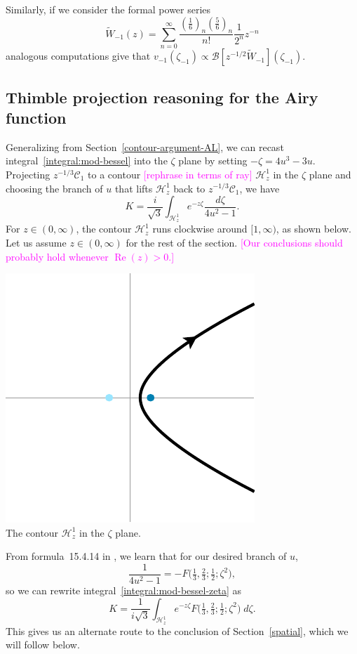 \documentclass{article}
\newcommand{\borel}{\mathcal{B}}
\theoremstyle{definition}
\theoremstyle{plain}
\begin{document}
Similarly, if we consider the formal power series
\begin{equation}
\tilde{W}_{-1}(z)=\sum_{n=0}^{\infty}\frac{\left(\frac{1}{6}\right)_n\left(\frac{5}{6}\right)_n}{n!}\frac{1}{2^n}z^{-n}
\end{equation}
analogous computations give that $v_{-1}(\zeta_{-1})\propto\borel\left[z^{-1/2}\tilde{W}_{-1}\right](\zeta_{-1})$.
\subsection{Thimble projection reasoning for the Airy function}\label{contour-argument}
Generalizing from Section~\ref{contour-argument-AL}, we can recast integral~\eqref{integral:mod-bessel} into the $\zeta$ plane by setting $-\zeta = 4u^3 - 3u$. Projecting $z^{-1/3} \mathcal{C}_1$ to a contour \textcolor{magenta}{[rephrase in terms of ray]} $\mathcal{H}^1_z$ in the $\zeta$ plane and choosing the branch of $u$ that lifts $\mathcal{H}^1_z$ back to $z^{-1/3} \mathcal{C}_1$, we have
\begin{equation}\label{integral:mod-bessel-zeta}
K = \frac{i}{\sqrt{3}} \int_{\mathcal{H}^1_z} e^{-z\zeta}\frac{d\zeta}{4u^2 - 1}.
\end{equation}
For $z \in (0, \infty)$, the contour $\mathcal{H}^1_z$ runs clockwise around $[1, \infty)$, as shown below. Let us assume $z \in (0, \infty)$ for the rest of the section. \textcolor{magenta}{[Our conclusions should probably hold whenever $\operatorname{Re}(z) > 0$.]}
\begin{center}
\includegraphics{figures/zeta_contour_3.pdf} \\[1em]
{\small The contour $\mathcal{H}^1_z$ in the $\zeta$ plane.}
\end{center}
From formula~15.4.14 in \cite{dlmf}, we learn that for our desired branch of $u$,
\[ \frac{1}{4u^2 - 1} = -F\big(\tfrac{1}{3}, \tfrac{2}{3}; \tfrac{1}{2}; \zeta^2\big), \]
so we can rewrite integral~\eqref{integral:mod-bessel-zeta} as
\[ K = \frac{1}{i\sqrt{3}} \int_{\mathcal{H}^1_z} e^{-z\zeta} F\big(\tfrac{1}{3}, \tfrac{2}{3}; \tfrac{1}{2}; \zeta^2\big)\;d\zeta. \]
This gives us an alternate route to the conclusion of Section~\ref{spatial}, which we will follow below.
\end{document}
